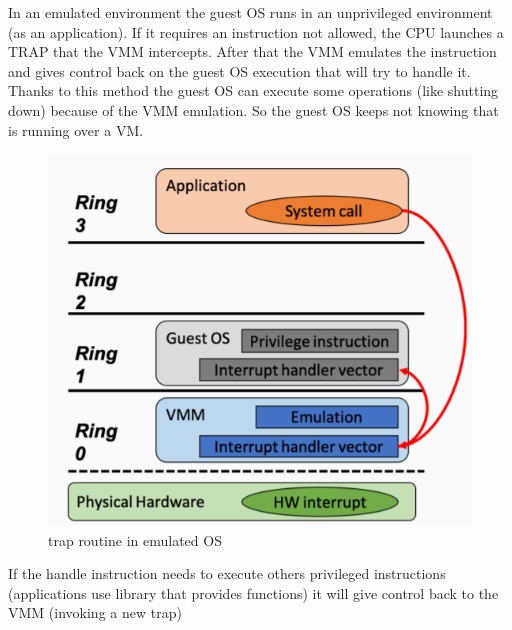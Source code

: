 In an emulated environment the guest OS runs in an unprivileged environment (as an application). If it requires an instruction not allowed, the CPU launches a TRAP that the VMM intercepts. After that the VMM emulates the instruction and gives control back on the guest OS execution that will try to handle it. 
Thanks to this method the guest OS can execute some operations (like shutting down) because of the VMM emulation. So the guest OS keeps not knowing that is running over a VM.
\begin{figure}[H]
    \centering
    \includegraphics[scale=0.37]{images/trap in emulation.png}
    \caption{trap routine in emulated OS}
\end{figure}
If the handle instruction needs to execute others privileged instructions (applications use library that provides functions) it will give control back to the VMM (invoking a new trap)
